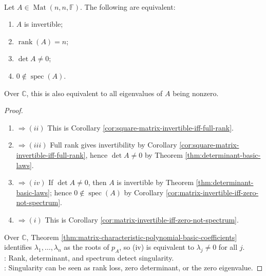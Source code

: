 \begin{corollary} \label{cor:matrix-nonsingularity-rank-determinant-spectrum-dictionary} \\
Let $A\in\operatorname{Mat}(n,n,\mathbb{F})$. The following are equivalent:
\begin{enumerate}[label=(\roman*)]
\setlength{\itemsep}{0pt}
\item $A$ is invertible;
\item $\operatorname{rank}(A)=n$;
\item $\det A\neq0$;
\item $0\notin\operatorname{spec}(A)$.
\end{enumerate}
Over $\mathbb{C}$, this is also equivalent to all eigenvalues of $A$ being nonzero.
\begin{proof}
\begin{enumerate}[label=(\roman*).]
\setlength{\itemsep}{0pt}
\item[$(i)$]$\Rightarrow (ii)$ This is Corollary \ref{cor:square-matrix-invertible-iff-full-rank}.
\item[$(ii)$]$\Rightarrow (iii)$ Full rank gives invertibility by Corollary \ref{cor:square-matrix-invertible-iff-full-rank}, hence $\det A\neq0$ by Theorem \ref{thm:determinant-basic-laws}.
\item[$(iii)$]$\Rightarrow (iv)$ If $\det A\neq0$, then $A$ is invertible by Theorem \ref{thm:determinant-basic-laws}; hence $0\notin\operatorname{spec}(A)$ by Corollary \ref{cor:matrix-invertible-iff-zero-not-spectrum}.
\item[$(iv)$]$\Rightarrow (i)$ This is Corollary \ref{cor:matrix-invertible-iff-zero-not-spectrum}.
\end{enumerate}
Over $\mathbb{C}$, Theorem \ref{thm:matrix-characteristic-polynomial-basic-coefficients} identifies $\lambda_1,\ldots,\lambda_n$ as the roots of $p_A$, so (iv) is equivalent to $\lambda_j\neq0$ for all $j$.\\
: Rank, determinant, and spectrum detect singularity.\\
: Singularity can be seen as rank loss, zero determinant, or the zero eigenvalue.
\end{proof}
\end{corollary}

